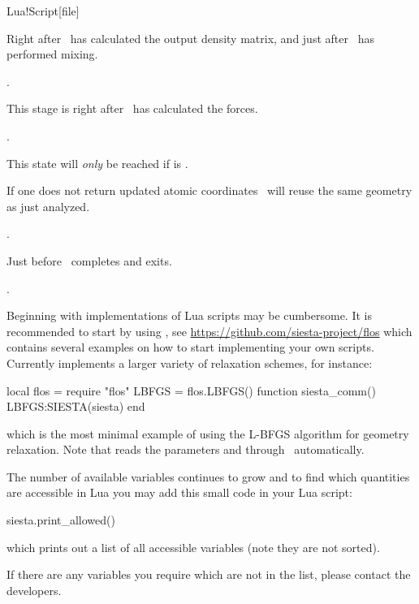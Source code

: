 \begin{fdfentry}{Lua!Script}[file]
\begin{fdfoptions}
    \option[SCF]%
    Right after \siesta\ has calculated the output density matrix, and
    just after \siesta\ has performed mixing.

    \note {}.

    \option[Forces]%
    This stage is right after \siesta\ has calculated the forces.

    \note {}.

    \option[Move]%
    This state will \emph{only} be reached if  is
    .

    If one does not return updated atomic coordinates \siesta\ will
    reuse the same geometry as just analyzed.

    \note {}.
    
    \option[Analysis]%
    Just before \siesta\ completes and exits. 

    \note {}.

  \end{fdfoptions}

  Beginning with implementations of Lua scripts may be cumbersome. It
  is recommended to start by using , see
  \url{https://github.com/siesta-project/flos} which contains several
  examples on how to start implementing your own scripts.
  Currently  implements a larger variety of relaxation
  schemes, for instance:
  \begin{codeexample}
    local flos = require "flos"
    LBFGS = flos.LBFGS()
    function siesta_comm()
       LBFGS:SIESTA(siesta)
    end
  \end{codeexample}
  which is the most minimal example of using the L-BFGS algorithm for
  geometry relaxation. Note that  reads the parameters
   and  through \siesta\
  automatically. 

  \note The number of available variables continues to grow and to
  find which quantities are accessible in Lua you may add this small
  code in your Lua script:
  \begin{codeexample}
    siesta.print_allowed()
  \end{codeexample}
  which prints out a list of all accessible variables (note they are
  not sorted).
  
  If there are any variables you require which are not in the list,
  please contact the developers.


\end{fdfentry}
